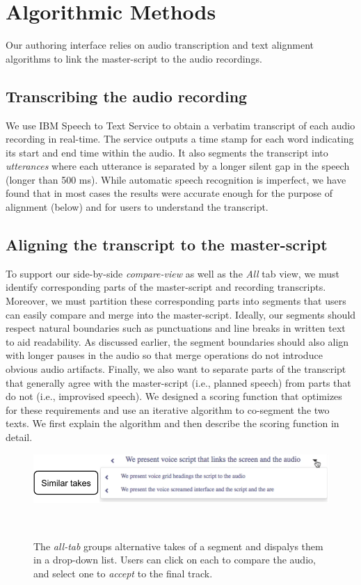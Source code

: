 \section{Algorithmic Methods}
\label{sec:algorithms}
Our authoring interface relies on audio transcription and text alignment algorithms to link the master-script to the audio recordings.  

\subsection{Transcribing the audio recording}
We use IBM Speech to Text Service \cite{ibmspeechtotext} to obtain a verbatim transcript of each audio recording in real-time. The service outputs a time stamp for each word indicating its start and end time within the audio. It also segments the transcript into \textit{utterances} where each utterance is separated by a longer silent gap in the speech (longer than 500 ms). While automatic speech recognition is imperfect, we have found that in most cases the results were accurate enough for the purpose of alignment (below) and for users to understand the transcript. 
  
\subsection{Aligning the transcript to the master-script}
To support our side-by-side \textit{compare-view} as well as the \textit{All} tab view, we must identify corresponding parts of the master-script and recording transcripts. Moreover, we must partition these corresponding parts into segments that users can easily compare and merge into the master-script. Ideally, our segments should respect natural boundaries such as punctuations and line breaks in written text to aid readability. As discussed earlier, the segment boundaries should also align with longer pauses in the audio so that merge operations do not introduce obvious audio artifacts. Finally, we also want to separate parts of the transcript that generally agree with the master-script (i.e., planned speech) from parts that do not (i.e., improvised speech).  We designed a scoring function that optimizes for these requirements and use an iterative algorithm to co-segment the two texts. We first explain the algorithm and then describe the scoring function in detail.
\begin{figure}
\centering
  \includegraphics[width=1.0\columnwidth]{figures/multipletakes}
  \caption{The \textit{all-tab} groups alternative takes of a segment and dispalys them in a drop-down list. Users can click on each to compare the audio, and select one to \textit{accept} to the final track.  }~\label{fig:multipletakes}
\end{figure}

